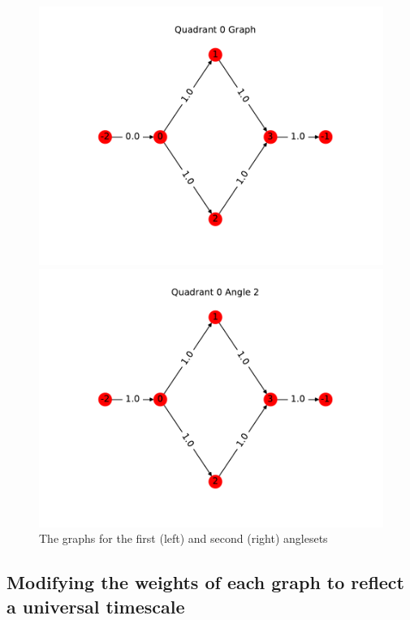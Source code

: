 \begin{figure}[H]
\begin{minipage}[c]{0.5\textwidth}
\centering
\includegraphics[scale=0.6]{../../figures/q0_postpipeline.pdf}
\end{minipage}
\begin{minipage}[c]{0.5\textwidth}
\centering
\includegraphics[scale=0.6]{../../figures/q4_postpipeline.pdf}
\end{minipage}
\caption{The graphs for the first (left) and second (right) anglesets}
\label{angular_pipeline}
\end{figure}

\subsection{Modifying the weights of each graph to reflect a universal timescale}\label{sec:universal}

